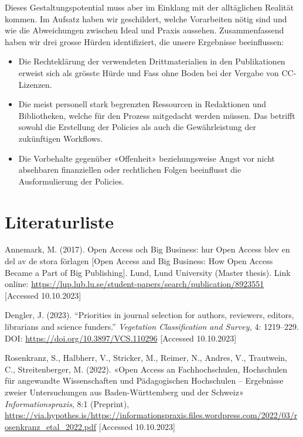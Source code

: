 \documentclass[a4paper,
fontsize=11pt,
oneside,
numbers=noperiodatend,
parskip=half-,
bibliography=totoc,
final
]{scrartcl}
\begin{document}
Dieses Gestaltungspotential muss aber im Einklang mit der alltäglichen
Realität kommen. Im Aufsatz haben wir geschildert, welche Vorarbeiten
nötig sind und wie die Abweichungen zwischen Ideal und Praxis aussehen.
Zusammenfassend haben wir drei grosse Hürden identifiziert, die unsere
Ergebnisse beeinflussen:

\begin{itemize}
\item
  Die Rechteklärung der verwendeten Drittmaterialien in den
  Publikationen erweist sich als grösste Hürde und Fass ohne Boden bei
  der Vergabe von CC-Lizenzen.
\item
  Die meist personell stark begrenzten Ressourcen in Redaktionen und
  Bibliotheken, welche für den Prozess mitgedacht werden müssen. Das
  betrifft sowohl die Erstellung der Policies als auch die
  Gewährleistung der zukünftigen Workflows.
\item
  Die Vorbehalte gegenüber «Offenheit» beziehungsweise Angst vor nicht
  absehbaren finanziellen oder rechtlichen Folgen beeinflusst die
  Ausformulierung der Policies.
\end{itemize}

\hypertarget{literaturliste}{%
\section{Literaturliste}\label{literaturliste}}

Annemark, M. (2017). Open Access och Big Business: hur Open Access blev
en del av de stora förlagen {[}Open Access and Big Business: How Open
Access Became a Part of Big Publishing{]}. Lund, Lund University (Master
thesis). Link online:
\url{https://lup.lub.lu.se/student-papers/search/publication/8923551}
{[}Accessed 10.10.2023{]}

Dengler, J. (2023). \enquote{Priorities in journal selection for
authors, reviewers, editors, librarians and science funders.}
\emph{Vegetation Classification and Survey,} 4: 1219--229. DOI:
\url{https://doi.org/10.3897/VCS.110296} {[}Accessed 10.10.2023{]}

Rosenkranz, S., Halbherr, V., Stricker, M., Reimer, N., Andres, V.,
Trautwein, C., Streitenberger, M. (2022). «Open Access an
Fachhochschulen, Hochschulen für angewandte Wissenschaften und
Pädagogischen Hochschulen -- Ergebnisse zweier Untersuchungen aus
Baden-Württemberg und der Schweiz» \emph{Informationspraxis}, 8:1
(Preprint),
\url{https://via.hypothes.is/https://informationspraxis.files.wordpress.com/2022/03/rosenkranz_etal_2022.pdf}
{[}Accessed 10.10.2023{]}
\end{document}
